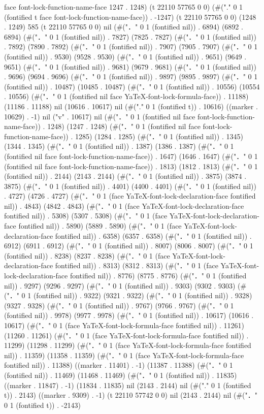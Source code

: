 face font-lock-function-name-face 1247 . 1248) (t 22110 57765 0 0) (#("." 0 1 (fontified t face font-lock-function-name-face)) . -1247) (t 22110 57765 0 0) (1248 . 1249) 585 (t 22110 57765 0 0) nil (#("．" 0 1 (fontified nil)) . 6894) (6892 . 6894) (#("．" 0 1 (fontified nil)) . 7827) (7825 . 7827) (#("．" 0 1 (fontified nil)) . 7892) (7890 . 7892) (#("．" 0 1 (fontified nil)) . 7907) (7905 . 7907) (#("．" 0 1 (fontified nil)) . 9530) (9528 . 9530) (#("．" 0 1 (fontified nil)) . 9651) (9649 . 9651) (#("．" 0 1 (fontified nil)) . 9681) (9679 . 9681) (#("．" 0 1 (fontified nil)) . 9696) (9694 . 9696) (#("．" 0 1 (fontified nil)) . 9897) (9895 . 9897) (#("．" 0 1 (fontified nil)) . 10487) (10485 . 10487) (#("．" 0 1 (fontified nil)) . 10556) (10554 . 10556) (#("．" 0 1 (fontified nil face YaTeX-font-lock-formula-face)) . 11188) (11186 . 11188) nil (10616 . 10617) nil (#("." 0 1 (fontified t)) . 10616) ((marker . 10629) . -1) nil ("v" . 10617) nil (#("．" 0 1 (fontified nil face font-lock-function-name-face)) . 1248) (1247 . 1248) (#("．" 0 1 (fontified nil face font-lock-function-name-face)) . 1285) (1284 . 1285) (#("．" 0 1 (fontified nil)) . 1345) (1344 . 1345) (#("．" 0 1 (fontified nil)) . 1387) (1386 . 1387) (#("．" 0 1 (fontified nil face font-lock-function-name-face)) . 1647) (1646 . 1647) (#("．" 0 1 (fontified nil face font-lock-function-name-face)) . 1813) (1812 . 1813) (#("．" 0 1 (fontified nil)) . 2144) (2143 . 2144) (#("．" 0 1 (fontified nil)) . 3875) (3874 . 3875) (#("．" 0 1 (fontified nil)) . 4401) (4400 . 4401) (#("．" 0 1 (fontified nil)) . 4727) (4726 . 4727) (#("．" 0 1 (face YaTeX-font-lock-declaration-face fontified nil)) . 4843) (4842 . 4843) (#("．" 0 1 (face YaTeX-font-lock-declaration-face fontified nil)) . 5308) (5307 . 5308) (#("．" 0 1 (face YaTeX-font-lock-declaration-face fontified nil)) . 5890) (5889 . 5890) (#("．" 0 1 (face YaTeX-font-lock-declaration-face fontified nil)) . 6358) (6357 . 6358) (#("．" 0 1 (fontified nil)) . 6912) (6911 . 6912) (#("．" 0 1 (fontified nil)) . 8007) (8006 . 8007) (#("．" 0 1 (fontified nil)) . 8238) (8237 . 8238) (#("．" 0 1 (face YaTeX-font-lock-declaration-face fontified nil)) . 8313) (8312 . 8313) (#("．" 0 1 (face YaTeX-font-lock-declaration-face fontified nil)) . 8776) (8775 . 8776) (#("．" 0 1 (fontified nil)) . 9297) (9296 . 9297) (#("．" 0 1 (fontified nil)) . 9303) (9302 . 9303) (#("．" 0 1 (fontified nil)) . 9322) (9321 . 9322) (#("．" 0 1 (fontified nil)) . 9328) (9327 . 9328) (#("．" 0 1 (fontified nil)) . 9767) (9766 . 9767) (#("．" 0 1 (fontified nil)) . 9978) (9977 . 9978) (#("．" 0 1 (fontified nil)) . 10617) (10616 . 10617) (#("．" 0 1 (face YaTeX-font-lock-formula-face fontified nil)) . 11261) (11260 . 11261) (#("．" 0 1 (face YaTeX-font-lock-formula-face fontified nil)) . 11299) (11298 . 11299) (#("．" 0 1 (face YaTeX-font-lock-formula-face fontified nil)) . 11359) (11358 . 11359) (#("．" 0 1 (face YaTeX-font-lock-formula-face fontified nil)) . 11388) ((marker . 11401) . -1) (11387 . 11388) (#("．" 0 1 (fontified nil)) . 11469) (11468 . 11469) (#("．" 0 1 (fontified nil)) . 11835) ((marker . 11847) . -1) (11834 . 11835) nil (2143 . 2144) nil (#("." 0 1 (fontified t)) . 2143) ((marker . 9309) . -1) (t 22110 57742 0 0) nil (2143 . 2144) nil (#("．" 0 1 (fontified t)) . -2143) 